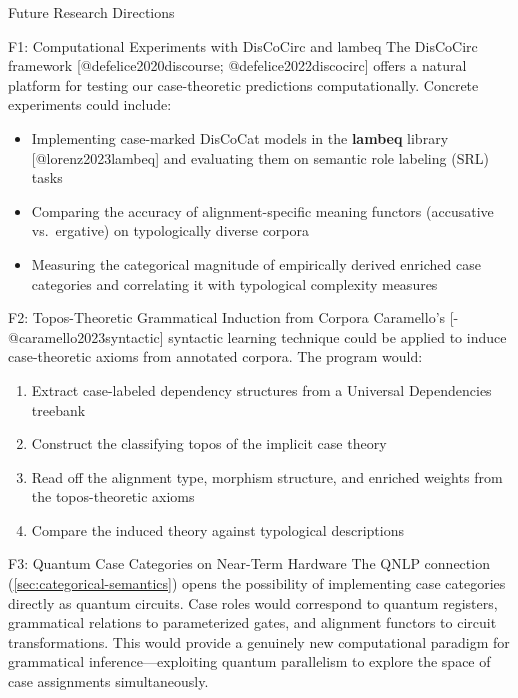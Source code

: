 \documentclass[
  ignorenonframetext,
]{beamer}
\providecommand{\tightlist}{%
  \setlength{\itemsep}{0pt}\setlength{\parskip}{0pt}}
\begin{document}
\begin{frame}{Future Research Directions}
\protect{}\label{future-research-directions}
\begin{block}{F1: Computational Experiments with DisCoCirc and lambeq}
\protect{}\label{f1-computational-experiments-with-discocirc-and-lambeq}
The DisCoCirc framework {[}@defelice2020discourse;
@defelice2022discocirc{]} offers a natural platform for testing our
case-theoretic predictions computationally. Concrete experiments could
include:

\begin{itemize}
\tightlist
\item
  Implementing case-marked DisCoCat models in the \textbf{lambeq}
  library {[}@lorenz2023lambeq{]} and evaluating them on semantic role
  labeling (SRL) tasks
\item
  Comparing the accuracy of alignment-specific meaning functors
  (accusative vs.~ergative) on typologically diverse corpora
\item
  Measuring the categorical magnitude of empirically derived enriched
  case categories and correlating it with typological complexity
  measures
\end{itemize}
\end{block}

\begin{block}{F2: Topos-Theoretic Grammatical Induction from Corpora}
\protect{}\label{f2-topos-theoretic-grammatical-induction-from-corpora}
Caramello's {[}-@caramello2023syntactic{]} syntactic learning technique
could be applied to induce case-theoretic axioms from annotated corpora.
The program would:

\begin{enumerate}
\tightlist
\item
  Extract case-labeled dependency structures from a Universal
  Dependencies treebank
\item
  Construct the classifying topos of the implicit case theory
\item
  Read off the alignment type, morphism structure, and enriched weights
  from the topos-theoretic axioms
\item
  Compare the induced theory against typological descriptions
\end{enumerate}
\end{block}

\begin{block}{F3: Quantum Case Categories on Near-Term Hardware}
\protect{}\label{f3-quantum-case-categories-on-near-term-hardware}
The QNLP connection (\autoref{sec:categorical-semantics}) opens the
possibility of implementing case categories directly as quantum
circuits. Case roles would correspond to quantum registers, grammatical
relations to parameterized gates, and alignment functors to circuit
transformations. This would provide a genuinely new computational
paradigm for grammatical inference---exploiting quantum parallelism to
explore the space of case assignments simultaneously.
\end{block}


\end{frame}
\end{document}
